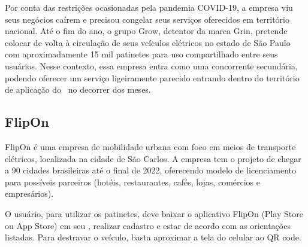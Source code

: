 Por conta das restrições ocasionadas pela pandemia COVID-19, a empresa viu seus negócios caírem e precisou congelar seus serviços oferecidos em território nacional. Até o fim do ano, o grupo Grow, detentor da marca Grin, pretende colocar de volta à circulação de seus veículos elétricos no estado de São Paulo com aproximadamente 15 mil patinetes para uso compartilhado entre seus usuários. Nesse contexto, essa empresa entra como uma concorrente secundária, podendo oferecer um serviço ligeiramente parecido entrando dentro do território de aplicação do \nomeproduto\ no decorrer dos meses.


\subsection{FlipOn}
\label{sec:flipon}

FlipOn é uma empresa de mobilidade urbana com foco em meios de transporte elétricos, localizada na cidade de São Carlos. A empresa tem o projeto de chegar a 90 cidades brasileiras até o final de 2022, oferecendo modelo de licenciamento para possíveis parceiros (hotéis, restaurantes, cafés, lojas, comércios e empresários).

O usuário, para utilizar os patinetes, deve baixar o aplicativo FlipOn (Play Store ou App Store)  em seu , realizar cadastro e estar de acordo com as orientações listadas. Para destravar o veículo, basta aproximar a tela do celular ao QR code.

